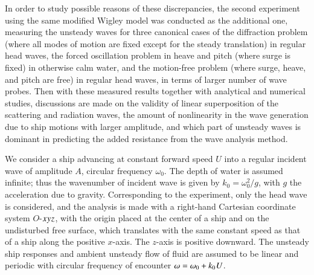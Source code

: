 \documentclass[11pt,fleqn,a3]{article}
\begin{document}
In order to study possible reasons of these discrepancies, the second experiment 
using the same modified Wigley model was conducted as the additional one, 
measuring the unsteady waves for three canonical cases of the diffraction 
problem (where all modes of motion are fixed except for the steady 
translation) in regular head waves, the forced oscillation problem 
in heave and pitch (where surge is fixed) in otherwise calm water, 
and the motion-free problem (where surge, heave, and pitch are free) 
in regular head waves, in terms of larger number of wave probes.
%
Then with these measured results together with analytical and numerical studies, 
discussions are made on the validity of linear superposition of the 
scattering and radiation waves, the amount of nonlinearity in the wave 
generation due to ship motions with larger amplitude, 
and which part of unsteady waves is dominant 
in predicting the added resistance from the wave analysis method.

%
%
\medskip%
We consider a ship advancing at constant forward speed $U$ into 
a regular incident wave of amplitude $A$, circular frequency $\omega_0$. 
The depth of water is assumed infinite; thus the wavenumber of incident wave 
is given by $k_0 =\omega_0^2 /g$, with $g$ the acceleration due to gravity.
Corresponding to the experiment, only the head wave is considered, 
and the analysis is made with a right-hand Cartesian coordinate 
system $O$-$x\hspace*{0.2mm} y\hspace*{0.2mm} z$, with the origin placed at the center of a ship 
and on the undisturbed free surface, which translates with the same constant 
speed as that of a ship along the positive $x$-axis. 
The $z$-axis is positive downward. The unsteady ship responses and ambient 
unsteady flow of fluid are assumed to be linear and periodic with circular 
frequency of encounter $\omega =\omega_0 + k_0\hspace*{0.2mm} U$.
\\
\end{document}
